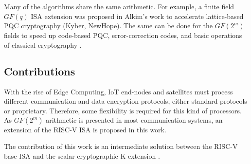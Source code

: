 Many of the algorithms share the same arithmetic. For example, a finite field $GF(q)$ ISA extension 
was proposed in Alkim's \cite{Alkim_Evkan_Lahr_Niederhagen_Petri_2020} work to accelerate lattice-based PQC 
cryptography (Kyber, NewHope). The same can be done for the $GF(2^m)$ fields to speed up code-based PQC, 
error-correction codes, and basic operations of classical cryptography \cite{10.1145/944645.944659}.

\subsection{Contributions}

With the rise of Edge Computing, IoT end-nodes \cite{8123913} and satellites \cite{8945402} must process different communication and data encryption protocols, 
either standard protocols or proprietary. Therefore, some flexibility is required for this kind of processors.
As $GF(2^m) $ arithmetic is presented in most communication systems, an extension of the RISC-V ISA is proposed in this work. 

The contribution of this work is an intermediate solution between the RISC-V base ISA and the scalar cryptographic K extension \cite{zehrisc}. 



